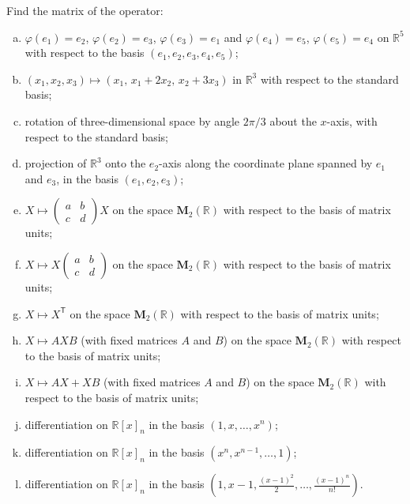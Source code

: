 \begin{problem}\label{operator_list}
Find the matrix of the operator:
\begin{enumerate}[a) ]
    \item $\varphi(e_1) = e_2$, $\varphi(e_2) = e_3$, $\varphi(e_3) = e_1$ and $\varphi(e_4) = e_5$, $\varphi(e_5) = e_4$ on $\mathbb{R}^5$ with respect to the basis $\left(e_1, e_2, e_3, e_4, e_5\right)$;
    \item $\left(x_1, x_2, x_3\right) \mapsto \left(x_1,\, x_1+2 x_2,\, x_2+3 x_3\right)$ in $\mathbb{R}^3$ with respect to the standard basis;
    \item rotation of three-dimensional space by angle $2\pi/3$ about the $x$-axis, with respect to the standard basis;
    \item projection of $\mathbb{R}^3$ onto the $e_2$-axis along the coordinate plane spanned by $e_1$ and $e_3$, in the basis $\left(e_1, e_2, e_3\right)$;
    \item $X \mapsto \begin{pmatrix}a & b \\ c & d\end{pmatrix} X$ on the space $\mathbf{M}_2(\mathbb{R})$ with respect to the basis of matrix units;
    \item $X \mapsto X \begin{pmatrix}a & b \\ c & d\end{pmatrix}$ on the space $\mathbf{M}_2(\mathbb{R})$ with respect to the basis of matrix units;
    \item $X \mapsto X^{\mathsf T}$ on the space $\mathbf{M}_2(\mathbb{R})$ with respect to the basis of matrix units;
    \item $X \mapsto A X B$ (with fixed matrices $A$ and $B$) on the space $\mathbf{M}_2(\mathbb{R})$ with respect to the basis of matrix units;
    \item $X \mapsto A X + X B$ (with fixed matrices $A$ and $B$) on the space $\mathbf{M}_2(\mathbb{R})$ with respect to the basis of matrix units;
    \item differentiation on $\mathbb{R}[x]_n$ in the basis $(1, x, \ldots, x^n)$;
    \item differentiation on $\mathbb{R}[x]_n$ in the basis $(x^n, x^{n-1}, \ldots, 1)$;
    \item differentiation on $\mathbb{R}[x]_n$ in the basis $\left(1, x-1, \frac{(x-1)^2}{2}, \ldots, \frac{(x-1)^n}{n!}\right)$.
\end{enumerate}
\end{problem}

